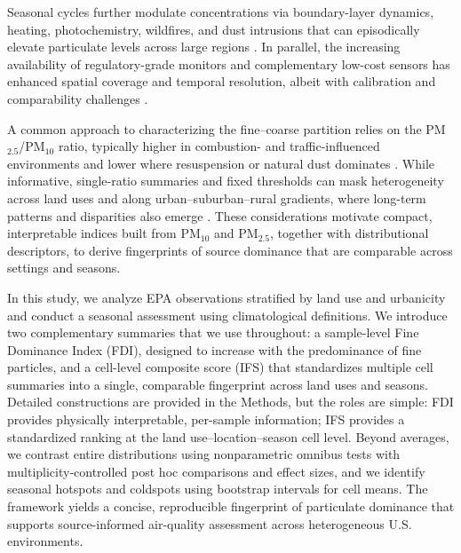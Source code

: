 \documentclass[a4paper,fleqn]{cas-sc}
\begin{document}
Seasonal cycles further modulate concentrations via boundary-layer dynamics, heating, photochemistry, wildfires, and dust intrusions that can episodically elevate particulate levels across large regions \citep{Achilleos2020, Allajbeu2017, Velsquez-Garca2024, Rawat2024, Butler2024, Yu2021}. In parallel, the increasing availability of regulatory-grade monitors and complementary low-cost sensors has enhanced spatial coverage and temporal resolution, albeit with calibration and comparability challenges \citep{Chen2022, Brilli2021}.

A common approach to characterizing the fine–coarse partition relies on the PM$_{2.5}$/PM$_{10}$ ratio, typically higher in combustion- and traffic-influenced environments and lower where resuspension or natural dust dominates \citep{Fan2021, Colangeli2022}. While informative, single-ratio summaries and fixed thresholds can mask heterogeneity across land uses and along urban–suburban–rural gradients, where long-term patterns and disparities also emerge \citep{Kilpatrick2024, Liu2023, Jbaily2022}. These considerations motivate compact, interpretable indices built from PM$_{10}$ and PM$_{2.5}$, together with distributional descriptors, to derive fingerprints of source dominance that are comparable across settings and seasons.

In this study, we analyze EPA observations stratified by land use and urbanicity and conduct a seasonal assessment using climatological definitions. We introduce two complementary summaries that we use throughout: a sample-level Fine Dominance Index (FDI), designed to increase with the predominance of fine particles, and a cell-level composite score (IFS) that standardizes multiple cell summaries into a single, comparable fingerprint across land uses and seasons. Detailed constructions are provided in the Methods, but the roles are simple: FDI provides physically interpretable, per-sample information; IFS provides a standardized ranking at the land use–location–season cell level. Beyond averages, we contrast entire distributions using nonparametric omnibus tests with multiplicity-controlled post hoc comparisons and effect sizes, and we identify seasonal hotspots and coldspots using bootstrap intervals for cell means. The framework yields a concise, reproducible fingerprint of particulate dominance that supports source-informed air-quality assessment across heterogeneous U.S. environments.
\end{document}
